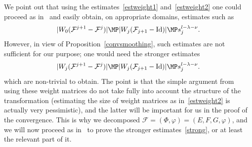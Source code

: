 We point out that using the estimates~\eqref{estweight1} and~\eqref{estweight2} one could proceed as in~\cite{Pos01} and easily obtain, on appropriate domains, estimates such as
\[ |W_0(\mathcal{F}^{j+1}-\mathcal{F}^{j})| \MP |W_j(\mathcal{F}_{j+1}-\mathrm{Id})|\MP s_j^{l-\lambda-\nu}. \]
However, in view of Proposition~\ref{convsmoothing}, such estimates are not sufficient for our purpose; one would need the stronger estimates
\begin{equation}\label{strong}
|W_j(\mathcal{F}^{j+1}-\mathcal{F}^{j})| \MP |W_j(\mathcal{F}_{j+1}-\mathrm{Id})|\MP s_j^{l-\lambda-\nu}.
\end{equation}
which are non-trivial to obtain. The point is that the simple argument from~\cite{Pos01} using these weight matrices do not take fully into account the structure of the transformation (estimating the size of weight matrices as in~\eqref{estweight2} is actually very pessimistic), and the latter will be important for us in the proof of the convergence. This is why we decomposed $\mathcal{F}=(\Phi,\varphi)=(E,F,G,\varphi)$, and we will now proceed as in~\cite{BF17} to prove the stronger estimates~\eqref{strong}, or at least the relevant part of it.

